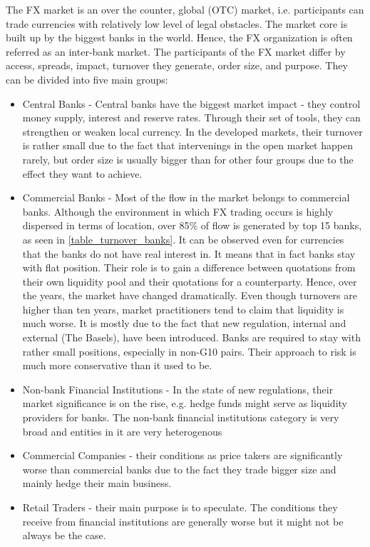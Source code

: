 \documentclass{pracamgr_wne}\usepackage[]{graphicx}\usepackage[]{color}
\begin{document}
The FX market is an over the counter, global (OTC) market, i.e. participants can trade currencies with relatively low level of legal obstacles. The market core is built up by the biggest banks in the world. Hence, the FX organization is often referred as
an inter-bank market. 
The participants of the FX market differ by access, spreads, impact, turnover they generate, order size, and purpose. They can be divided into five main groups:
\begin{itemize}
\item Central Banks - Central banks have the biggest market impact - they control money supply, interest and reserve rates. Through their set of tools, they can strengthen or weaken local currency. In the developed markets, their turnover is rather small due to the fact that intervenings 
in the open market happen rarely, but order size is usually bigger than for other four groups due to the effect they want to achieve.
\item Commercial Banks - Most of the flow in the market belongs to commercial banks. Although the environment in which FX trading occurs is highly dispersed in terms of location, over 85\% of flow is generated by top 15 banks, as seen in \ref{table_turnover_banks}. It can be observed even for currencies that the banks do not have real interest in. It means that in fact banks stay with flat position. 
Their role is to gain a difference between quotations from their own liquidity pool and their quotations for a counterparty. 
Hence, over the years, the market have changed dramatically. Even though turnovers are higher than ten years, market practitioners tend to claim that liquidity is much worse. It is mostly due to the fact that new regulation, internal and external (The Basels), have been introduced. 
Banks are required to stay with rather small positions, especially in non-G10 pairs. Their approach to risk is much more conservative than it used to be.
\item Non-bank Financial Institutions - In the state of new regulations, their market significance is on the rise, e.g. hedge funds might serve as liquidity providers for banks. The non-bank financial institutions category is very broad and entities in it are very heterogenous
\item Commercial Companies - their conditions as price takers are significantly worse than commercial banks due to the fact they trade bigger size and mainly hedge their main business.
\item Retail Traders - their main purpose is to speculate. The conditions they receive from financial institutions are generally worse but it might not be always be the case.
\end{itemize}
\end{document}
